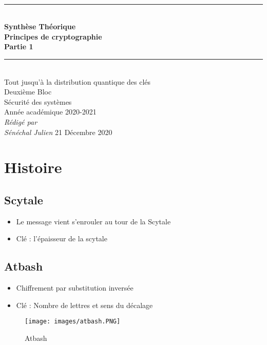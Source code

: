 \documentclass[a4paper]{article}
\newcommand{\HRule}{\rule{\linewidth}{0.5mm}}
\begin{document}
\begin{titlepage}
    \begin{sffamily}
        \begin{center}
            \textnormal{}\\[6.5cm]
            \HRule \\[0.4cm]
            { \Huge \bfseries Synthèse Théorique\\ Principes de cryptographie\\ Partie 1\\ [0.4cm] }
            \HRule \\[3cm]
            \Large
            Tout jusqu'à la distribution quantique des clés\\
            Deuxième Bloc\\
            Sécurité des systèmes\\
            Année académique 2020-2021\\[0.5cm]
            \emph{Rédigé par}\\
            \emph{Sénéchal Julien}
            \vfill
            {\large 21 Décembre 2020}
        \end{center}
    \end{sffamily}
\end{titlepage}

\section{Histoire}
\subsection{Scytale}
\begin{itemize}[label=\textbullet, font=\Large]
    \item Le message vient s'enrouler au tour de la Scytale
    \item Clé : l'épaisseur de la scytale
\end{itemize}

\subsection{Atbash}
\begin{itemize}[label=\textbullet, font=\Large]
    \item Chiffrement par substitution inversée
    \item Clé : Nombre de lettres et sens du décalage
\end{itemize}
\begin{figure}[H]
    \centering
    \texttt{[image: images/atbash.PNG]}
    \caption{Atbash}
\end{figure}
\end{document}
